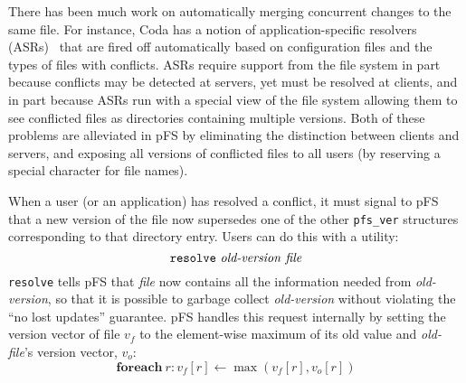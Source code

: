 There has been much work on automatically merging concurrent changes
to the same file.  For instance, Coda has a notion of
application-specific resolvers (ASRs)~\cite{kumar:conflict} that are
fired off automatically based on configuration files and the types of
files with conflicts.  ASRs require support from the file system in
part because conflicts may be detected at servers, yet must be
resolved at clients, and in part because ASRs run with a special view
of the file system allowing them to see conflicted files as
directories containing multiple versions.  Both of these problems are
alleviated in pFS by eliminating the distinction between clients and
servers, and exposing all versions of conflicted files to all users
(by reserving a special character for file names).

When a user (or an application) has resolved a conflict, it must
signal to pFS that a new version of the file now supersedes one of the
other \texttt{pfs\_ver} structures corresponding to that directory
entry.  Users can do this with a utility:
$$\mbox{\texttt{resolve} \emph{old-version} \emph{file}}$$
\texttt{resolve} tells pFS that \emph{file} now contains all the
information needed from \emph{old-version}, so that it is possible to
garbage collect \emph{old-version} without violating the ``no lost
updates'' guarantee.  pFS handles this request internally by setting
the version vector of file $v_f$ to the element-wise maximum of its
old value and \emph{old-file}'s version vector, $v_o$:
$$\mathbf{foreach}\>r:v_f[r]\gets\max(v_f[r],v_o[r])$$




